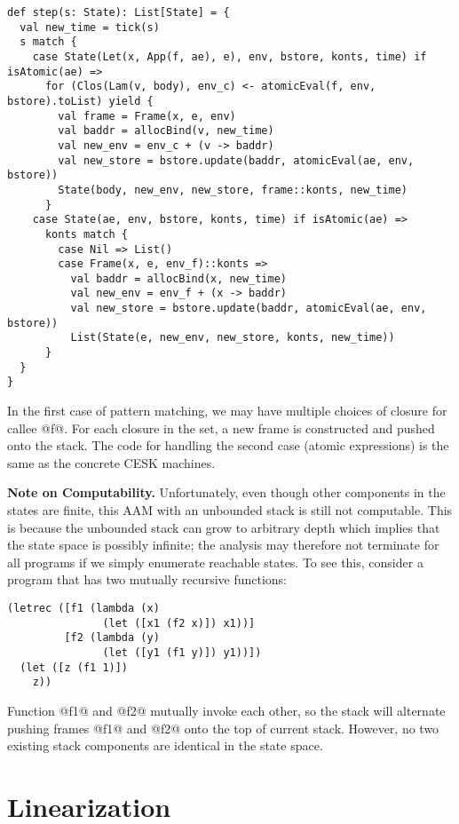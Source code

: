 \documentclass[acmsmall]{acmart}\settopmatter{}
\begin{document}
\begin{lstlisting}
def step(s: State): List[State] = {
  val new_time = tick(s)
  s match {
    case State(Let(x, App(f, ae), e), env, bstore, konts, time) if isAtomic(ae) =>
      for (Clos(Lam(v, body), env_c) <- atomicEval(f, env, bstore).toList) yield {
        val frame = Frame(x, e, env)
        val baddr = allocBind(v, new_time)
        val new_env = env_c + (v -> baddr)
        val new_store = bstore.update(baddr, atomicEval(ae, env, bstore))
        State(body, new_env, new_store, frame::konts, new_time)
      }
    case State(ae, env, bstore, konts, time) if isAtomic(ae) =>
      konts match {
        case Nil => List()
        case Frame(x, e, env_f)::konts =>
          val baddr = allocBind(x, new_time)
          val new_env = env_f + (x -> baddr)
          val new_store = bstore.update(baddr, atomicEval(ae, env, bstore))
          List(State(e, new_env, new_store, konts, new_time))
      }
  }
}
\end{lstlisting}

In the first case of pattern matching, we may have multiple choices of closure for callee @f@.
For each closure in the set, a new frame is constructed and pushed onto the stack.
The code for handling the second case (atomic expressions) is the same as the concrete CESK
machines.

\textbf{Note on Computability.}
Unfortunately, even though other components in the states are finite,
this AAM with an unbounded stack is still not computable.
This is because the unbounded stack can grow to arbitrary depth which implies that the state
space is possibly infinite; the analysis may therefore not terminate for all programs if we
simply enumerate reachable states. To see this, consider a program that has two mutually
recursive functions:

\begin{lstlisting}
(letrec ([f1 (lambda (x)
               (let ([x1 (f2 x)]) x1))]
         [f2 (lambda (y)
               (let ([y1 (f1 y)]) y1))])
  (let ([z (f1 1)])
    z))
\end{lstlisting}

Function @f1@ and @f2@ mutually invoke each other, so the stack will
alternate pushing frames @f1@ and @f2@ onto the top of current stack.
However, no two existing stack components are identical in the state space.

\section{Linearization} \label{linear}
\end{document}
